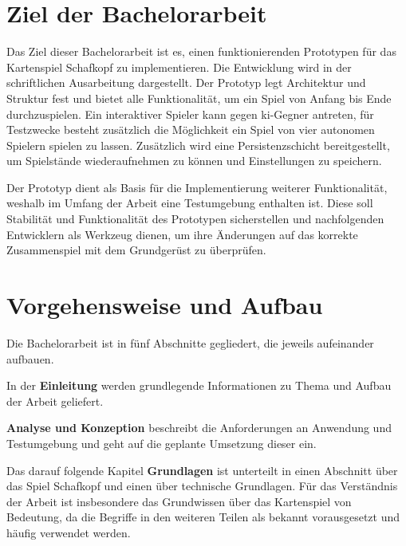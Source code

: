 \documentclass[
							a4paper, 
							11pt, 
							openany, 
							liststotoc,
							parskip=half, 
   							headings=normal
						]{scrreprt}
\begin{document}
\clearpage

\section{Ziel der Bachelorarbeit} \label{se:einleitung_ziel}
Das Ziel dieser Bachelorarbeit ist es, einen funktionierenden Prototypen für das Kartenspiel Schafkopf zu implementieren. Die Entwicklung wird in der schriftlichen Ausarbeitung dargestellt. Der Prototyp legt Architektur und Struktur fest und bietet alle Funktionalität, um ein Spiel von Anfang bis Ende durchzuspielen.\newline
Ein interaktiver Spieler kann gegen \acs{ki}-Gegner antreten, für Testzwecke besteht zusätzlich die Möglichkeit ein Spiel von vier autonomen Spielern spielen zu lassen.
Zusätzlich wird eine Persistenzschicht bereitgestellt, um Spielstände wiederaufnehmen zu können und Einstellungen zu speichern.

Der Prototyp dient als Basis für die Implementierung weiterer Funktionalität, weshalb im Umfang der Arbeit eine Testumgebung enthalten ist.\newline
Diese soll Stabilität und Funktionalität des Prototypen sicherstellen und nachfolgenden Entwicklern als Werkzeug dienen, um ihre Änderungen auf das korrekte Zusammenspiel mit dem Grundgerüst zu überprüfen.

\clearpage

\section{Vorgehensweise und Aufbau} \label{se:einleitung_aufbau}
Die Bachelorarbeit ist in fünf Abschnitte gegliedert, die jeweils aufeinander aufbauen.

In der \textbf{Einleitung} werden grundlegende Informationen zu Thema und Aufbau der Arbeit geliefert.

\textbf{Analyse und Konzeption} beschreibt die Anforderungen an Anwendung und Testumgebung und geht auf die geplante Umsetzung dieser ein.

Das darauf folgende Kapitel \textbf{Grundlagen} ist unterteilt in einen Abschnitt über das Spiel Schafkopf und einen über technische Grundlagen. Für das Verständnis der Arbeit ist insbesondere das Grundwissen über das Kartenspiel von Bedeutung, da die Begriffe in den weiteren Teilen als bekannt vorausgesetzt und häufig verwendet werden.
\end{document}
